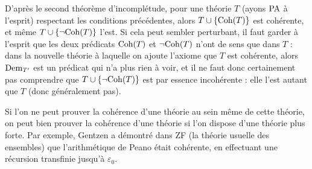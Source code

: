 \begin{rmk}
    D'après le second théorème d'incomplétude, pour une théorie $T$ (ayons $\mathrm{PA}$ à l'esprit) respectant les conditions précédentes, alors $T\cup \{\mathrm{Coh}(T)\}$ est cohérente, et même $T\cup\{\lnot\mathrm{Coh}(T)\}$ l'est. Si cela peut sembler perturbant, il faut garder à l'esprit que les deux prédicats $\mathrm{Coh}(T)$ et $\lnot\mathrm{Coh}(T)$ n'ont de sens que dans $T$ : dans la nouvelle théorie à laquelle on ajoute l'axiome que $T$ est cohérente, alors $\mathrm{Dem}_{T'}$ est un prédicat qui n'a plus rien à voir, et il ne faut donc certainement pas comprendre que $T\cup\{\lnot\mathrm{Coh}(T)\}$ est par essence incohérente : elle l'est autant que $T$ (donc généralement pas).
\end{rmk}

\begin{rmk}
    Si l'on ne peut prouver la cohérence d'une théorie au sein même de cette théorie, on peut bien prouver la cohérence d'une théorie si l'on dispose d'une théorie plus forte. Par exemple, Gentzen a démontré dans ZF (la théorie usuelle des ensembles) que l'arithmétique de Peano était cohérente, en effectuant une récursion transfinie jusqu'à $\varepsilon_0$.
\end{rmk}